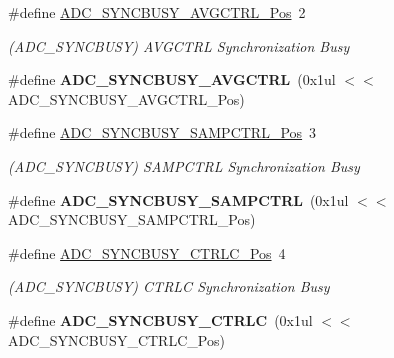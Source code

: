 \begin{DoxyCompactItemize}
\item 
\hypertarget{group___s_a_m_l21___a_d_c_gae102defd7714611cfece5ca35f9ebf68}{}\#define \hyperlink{group___s_a_m_l21___a_d_c_gae102defd7714611cfece5ca35f9ebf68}{A\+D\+C\+\_\+\+S\+Y\+N\+C\+B\+U\+S\+Y\+\_\+\+A\+V\+G\+C\+T\+R\+L\+\_\+\+Pos}~2\label{group___s_a_m_l21___a_d_c_gae102defd7714611cfece5ca35f9ebf68}

\begin{DoxyCompactList}\small\item\em (A\+D\+C\+\_\+\+S\+Y\+N\+C\+B\+U\+S\+Y) A\+V\+G\+C\+T\+R\+L Synchronization Busy \end{DoxyCompactList}\item 
\hypertarget{group___s_a_m_l21___a_d_c_gac074bc2ba4ea4b50f785aa2921dd927f}{}\#define {\bfseries A\+D\+C\+\_\+\+S\+Y\+N\+C\+B\+U\+S\+Y\+\_\+\+A\+V\+G\+C\+T\+R\+L}~(0x1ul $<$$<$ A\+D\+C\+\_\+\+S\+Y\+N\+C\+B\+U\+S\+Y\+\_\+\+A\+V\+G\+C\+T\+R\+L\+\_\+\+Pos)\label{group___s_a_m_l21___a_d_c_gac074bc2ba4ea4b50f785aa2921dd927f}

\item 
\hypertarget{group___s_a_m_l21___a_d_c_ga652f845bc3b2669609b54d7617776ea4}{}\#define \hyperlink{group___s_a_m_l21___a_d_c_ga652f845bc3b2669609b54d7617776ea4}{A\+D\+C\+\_\+\+S\+Y\+N\+C\+B\+U\+S\+Y\+\_\+\+S\+A\+M\+P\+C\+T\+R\+L\+\_\+\+Pos}~3\label{group___s_a_m_l21___a_d_c_ga652f845bc3b2669609b54d7617776ea4}

\begin{DoxyCompactList}\small\item\em (A\+D\+C\+\_\+\+S\+Y\+N\+C\+B\+U\+S\+Y) S\+A\+M\+P\+C\+T\+R\+L Synchronization Busy \end{DoxyCompactList}\item 
\hypertarget{group___s_a_m_l21___a_d_c_gaabe443e2f662295148aa163e69a56f17}{}\#define {\bfseries A\+D\+C\+\_\+\+S\+Y\+N\+C\+B\+U\+S\+Y\+\_\+\+S\+A\+M\+P\+C\+T\+R\+L}~(0x1ul $<$$<$ A\+D\+C\+\_\+\+S\+Y\+N\+C\+B\+U\+S\+Y\+\_\+\+S\+A\+M\+P\+C\+T\+R\+L\+\_\+\+Pos)\label{group___s_a_m_l21___a_d_c_gaabe443e2f662295148aa163e69a56f17}

\item 
\hypertarget{group___s_a_m_l21___a_d_c_ga7f55f0be81affbd8d96b570dbfc80682}{}\#define \hyperlink{group___s_a_m_l21___a_d_c_ga7f55f0be81affbd8d96b570dbfc80682}{A\+D\+C\+\_\+\+S\+Y\+N\+C\+B\+U\+S\+Y\+\_\+\+C\+T\+R\+L\+C\+\_\+\+Pos}~4\label{group___s_a_m_l21___a_d_c_ga7f55f0be81affbd8d96b570dbfc80682}

\begin{DoxyCompactList}\small\item\em (A\+D\+C\+\_\+\+S\+Y\+N\+C\+B\+U\+S\+Y) C\+T\+R\+L\+C Synchronization Busy \end{DoxyCompactList}\item 
\hypertarget{group___s_a_m_l21___a_d_c_ga8ffdc351c12a5a034c7e710ea1ea65ff}{}\#define {\bfseries A\+D\+C\+\_\+\+S\+Y\+N\+C\+B\+U\+S\+Y\+\_\+\+C\+T\+R\+L\+C}~(0x1ul $<$$<$ A\+D\+C\+\_\+\+S\+Y\+N\+C\+B\+U\+S\+Y\+\_\+\+C\+T\+R\+L\+C\+\_\+\+Pos)\label{group___s_a_m_l21___a_d_c_ga8ffdc351c12a5a034c7e710ea1ea65ff}


\end{DoxyCompactItemize}
